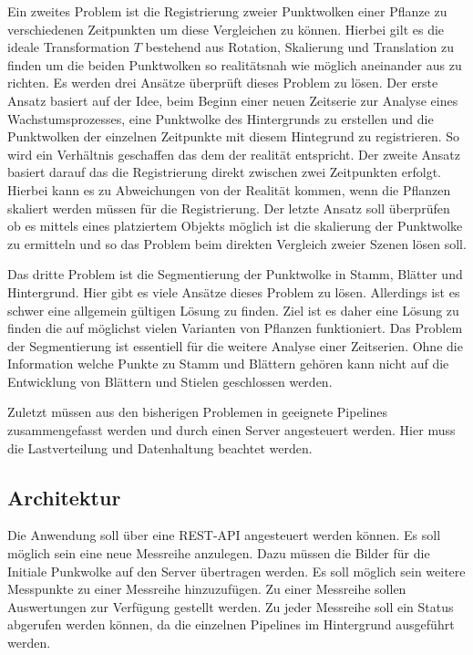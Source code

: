 \documentclass[12pt,titlepage, twoside]{article}
\begin{document}
Ein zweites Problem ist die Registrierung zweier Punktwolken einer Pflanze zu verschiedenen Zeitpunkten um diese Vergleichen zu können. 
Hierbei gilt es die ideale Transformation $T$ bestehend aus Rotation, Skalierung und Translation zu finden um die beiden Punktwolken so realitätsnah wie möglich aneinander aus zu richten.
Es werden drei Ansätze überprüft dieses Problem zu lösen. 
Der erste Ansatz basiert auf der Idee, beim Beginn einer neuen Zeitserie zur Analyse eines Wachstumsprozesses, eine Punktwolke des Hintergrunds zu erstellen und die Punktwolken der einzelnen Zeitpunkte mit diesem Hintegrund zu registrieren. So wird ein Verhältnis geschaffen das dem der realität entspricht.
Der zweite Ansatz basiert darauf das die Registrierung direkt zwischen zwei Zeitpunkten erfolgt. Hierbei kann es zu Abweichungen von der Realität kommen, wenn die Pflanzen skaliert werden müssen für die Registrierung.
Der letzte Ansatz soll überprüfen ob es mittels eines platziertem Objekts möglich ist die skalierung der Punktwolke zu ermitteln und so das Problem beim direkten Vergleich zweier Szenen lösen soll.

Das dritte Problem ist die Segmentierung der Punktwolke in Stamm, Blätter und Hintergrund. Hier gibt es viele Ansätze dieses Problem zu lösen. Allerdings ist es schwer eine allgemein gültigen Lösung zu finden. 
Ziel ist es daher eine Lösung zu finden die auf möglichst vielen Varianten von Pflanzen funktioniert. 
Das Problem der Segmentierung ist essentiell für die weitere Analyse einer Zeitserien. Ohne die Information welche Punkte zu Stamm und Blättern gehören kann nicht auf die Entwicklung von Blättern und Stielen geschlossen werden.

Zuletzt müssen aus den bisherigen Problemen in geeignete Pipelines zusammengefasst werden und durch einen Server angesteuert werden. Hier muss die Lastverteilung und Datenhaltung beachtet werden.

\subsection{Architektur}
\label{sec:realisierung:architektur}

Die Anwendung soll über eine REST-API angesteuert werden können. Es soll möglich sein eine neue Messreihe anzulegen. Dazu müssen die Bilder für die Initiale Punkwolke auf den Server übertragen werden. 
Es soll möglich sein weitere Messpunkte zu einer Messreihe hinzuzufügen. Zu einer Messreihe sollen Auswertungen zur Verfügung gestellt werden. 
Zu jeder Messreihe soll ein Status abgerufen werden können, da die einzelnen Pipelines im Hintergrund ausgeführt werden. 
\end{document}
